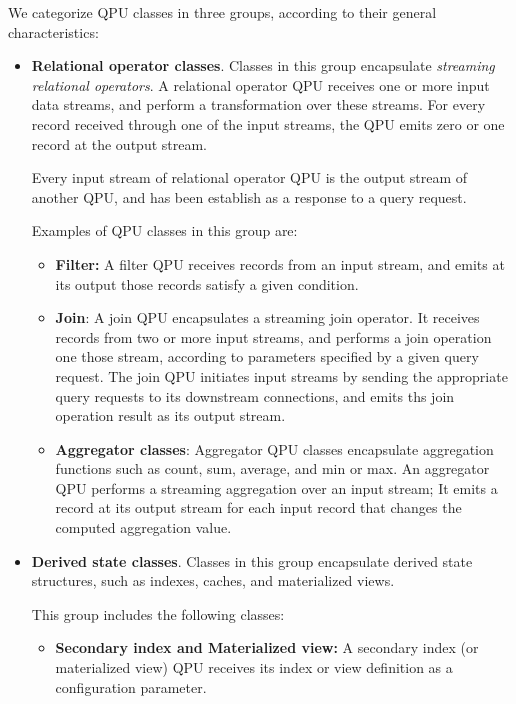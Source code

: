 We categorize QPU classes in three groups, according to their general characteristics:
\begin{itemize}
  \item \textbf{Relational operator classes}.
  Classes in this group encapsulate \textit{streaming relational operators}.
  A relational operator QPU receives one or more input data streams, and perform a transformation over these streams.
  For every record received through one of the input streams, the QPU emits zero or one record at the output stream.

  Every input stream of relational operator QPU is the output stream of another QPU, and has been establish as a response
  to a query request.

  Examples of QPU classes in this group are:
  \begin{itemize}
    \item \textbf{Filter:}
    A filter QPU receives records from an input stream, and  emits at its output those records satisfy a given condition.

    \item \textbf{Join}:
    A join QPU encapsulates a streaming join operator.
    It receives records from two or more input streams, and performs a join operation one those stream, according
    to parameters specified by a given query request.
    The join QPU initiates input streams by sending the appropriate query requests to its downstream connections,
    and emits ths join operation result as its output stream.

    \item \textbf{Aggregator classes}:
    Aggregator QPU classes encapsulate aggregation functions such as count, sum, average, and min or max.
    An aggregator QPU performs a streaming aggregation over an input stream;
    It emits a record at its output stream for each input record that changes the computed aggregation value.
  \end{itemize}

  \item \textbf{Derived state classes}.
  Classes in this group encapsulate derived state structures, such as indexes, caches, and materialized views.

  This group includes the following classes:
  \begin{itemize}
    \item \textbf{Secondary index and Materialized view:}
    A secondary index (or materialized view) QPU receives its index or view definition as a configuration parameter.


\end{itemize}
\end{itemize}
